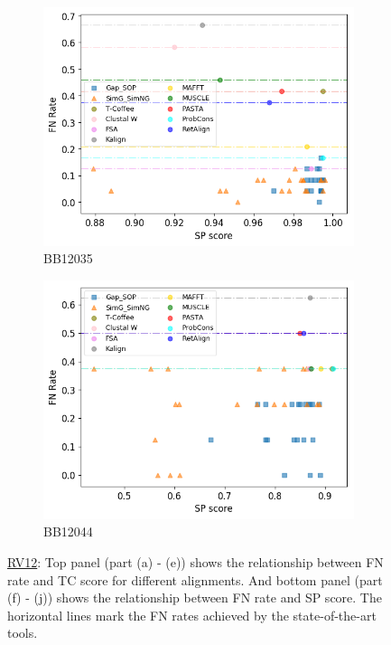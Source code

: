\begin{figure}[!htbp]
\begin{adjustwidth}{-1cm}{-1cm}
\begin{subfigure}{0.22\textwidth}
			\includegraphics[width=\columnwidth]{Figure/summary/precomputedInit/Balibase/BB12035_fnrate_vs_sp_2}
			\caption{BB12035}
		\end{subfigure}	
		\begin{subfigure}{0.22\textwidth}
			\includegraphics[width=\columnwidth]{Figure/summary/precomputedInit/Balibase/BB12044_fnrate_vs_sp_2}
			\caption{BB12044}
		\end{subfigure}
		\caption{\underline{RV12}: Top panel (part (a) - (e)) shows the relationship between FN rate and TC score for different alignments. And bottom panel (part (f) - (j)) shows the relationship between FN rate and SP score. The horizontal lines mark the FN rates achieved by the state-of-the-art tools.}
		\label{fig:rv12_fnrate_vs_tc}
	\end{adjustwidth}
\end{figure}

